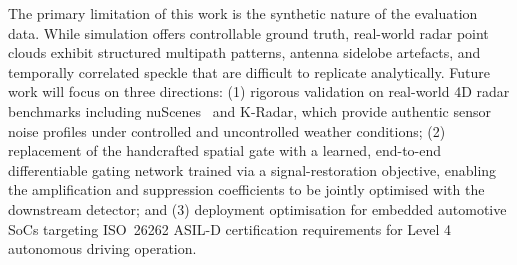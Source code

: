 \documentclass[conference]{IEEEtran}
\begin{document}
The primary limitation of this work is the synthetic nature of the evaluation data. While simulation offers controllable ground truth, real-world radar point clouds exhibit structured multipath patterns, antenna sidelobe artefacts, and temporally correlated speckle that are difficult to replicate analytically. Future work will focus on three directions: (1) rigorous validation on real-world 4D radar benchmarks including nuScenes~\cite{b1} and K-Radar, which provide authentic sensor noise profiles under controlled and uncontrolled weather conditions; (2) replacement of the handcrafted spatial gate with a learned, end-to-end differentiable gating network trained via a signal-restoration objective, enabling the amplification and suppression coefficients to be jointly optimised with the downstream detector; and (3) deployment optimisation for embedded automotive SoCs targeting ISO~26262 ASIL-D certification requirements for Level 4 autonomous driving operation.
\end{document}
